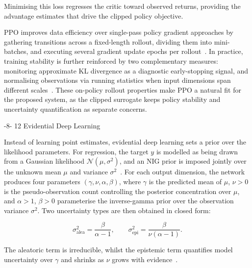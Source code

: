 \documentclass{sig-alternate}
\makeatletter
\renewcommand\subsection{\@startsection{subsection}{2}{\z@}%
    {-8\p@ \@plus -2\p@ \@minus -\p@}%
    {12\p@}%
    {\secfnt}}
\makeatother
\begin{document}
\noindent Minimising this loss regresses the critic toward observed returns, providing the advantage estimates that drive the clipped policy objective.

PPO improves data efficiency over single-pass policy gradient approaches by gathering transitions across a fixed-length rollout, dividing them into mini-batches, and executing several gradient update epochs per rollout~\cite{schulman2017ppo}. In practice, training stability is further reinforced by two complementary measures: monitoring approximate KL divergence as a diagnostic early-stopping signal, and normalising observations via running statistics when input dimensions span different scales~\cite{raffin2021sb3}. These on-policy rollout properties make PPO a natural fit for the proposed system, as the clipped surrogate keeps policy stability and uncertainty quantification as separate concerns.

\subsection{Evidential Deep Learning}

Instead of learning point estimates, evidential deep learning sets a prior over the likelihood parameters. For regression, the target $y$ is modelled as being drawn from a Gaussian likelihood $\mathcal{N}(\mu, \sigma^2)$, and an NIG prior is imposed jointly over the unknown mean $\mu$ and variance $\sigma^2$~\cite{amini2020deep}. For each output dimension, the network produces four parameters $(\gamma, \nu, \alpha, \beta)$, where $\gamma$ is the predicted mean of $\mu$, $\nu > 0$ is the pseudo-observation count controlling the posterior concentration over $\mu$, and $\alpha > 1$, $\beta > 0$ parameterise the inverse-gamma prior over the observation variance $\sigma^2$. Two uncertainty types are then obtained in closed form:

\begin{equation}
    \sigma^2_{\text{alea}} = \frac{\beta}{\alpha - 1}, \qquad
    \sigma^2_{\text{epi}} = \frac{\beta}{\nu(\alpha - 1)}.
    \label{eq:nig_uncertainty}
\end{equation}

\noindent The aleatoric term is irreducible, whilst the epistemic term quantifies model uncertainty over $\gamma$ and shrinks as $\nu$ grows with evidence~\cite{kendall2017uncertainties}.
\end{document}
